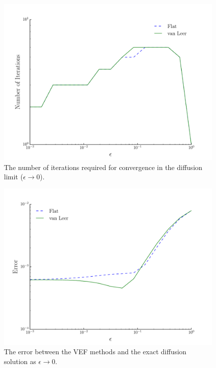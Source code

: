	\begin{figure}
		\centering
		\includegraphics[width=.75\textwidth]{figs/dl_it.pdf}
		\caption{The number of iterations required for convergence in the diffusion limit ($\epsilon \rightarrow 0$). }
		\label{fig:dl_it}
	\end{figure}
	\begin{figure}
		\centering
		\includegraphics[width=.75\textwidth]{figs/dl_err.pdf}
		\caption{The error between the VEF methods and the exact diffusion solution as $\epsilon \rightarrow 0$. }
		\label{fig:dl_err}
	\end{figure}